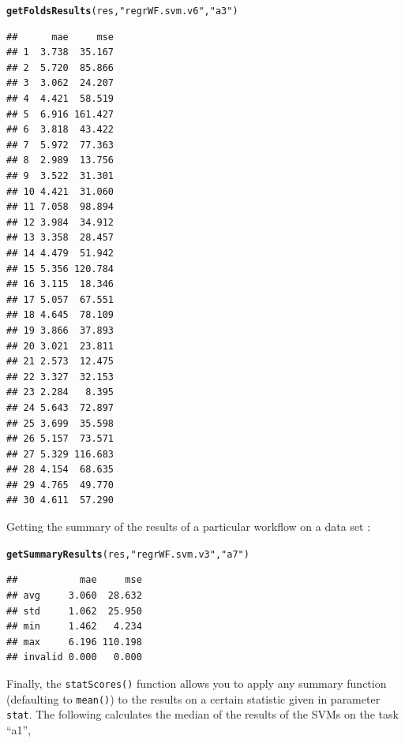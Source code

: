 \documentclass[10pt,a4paper]{article}\usepackage[]{graphicx}\usepackage[]{color}
\makeatletter
\newcommand{\hlstr}[1]{\textcolor[rgb]{0.192,0.494,0.8}{#1}}%
\newcommand{\hlstd}[1]{\textcolor[rgb]{0.345,0.345,0.345}{#1}}%
\newcommand{\hlkwd}[1]{\textcolor[rgb]{0.737,0.353,0.396}{\textbf{#1}}}%
\newenvironment{kframe}{%
 \def\at@end@of@kframe{}%
 \ifinner\ifhmode%
  \def\at@end@of@kframe{\end{minipage}}%
  \begin{minipage}{\columnwidth}%
 \fi\fi%
 \def\FrameCommand##1{\hskip\@totalleftmargin \hskip-\fboxsep
 \colorbox{shadecolor}{##1}\hskip-\fboxsep
     \hskip-\linewidth \hskip-\@totalleftmargin \hskip\columnwidth}%
 \MakeFramed {\advance\hsize-\width
   \@totalleftmargin\z@ \linewidth\hsize
   \@setminipage}}%
 {\par\unskip\endMakeFramed%
 \at@end@of@kframe}
\newenvironment{knitrout}{}{} %
\makeatother
\begin{document}
\begin{knitrout}
\color{fgcolor}\begin{kframe}
\begin{alltt}
\hlkwd{getFoldsResults}\hlstd{(res,} \hlstr{"regrWF.svm.v6"}\hlstd{,} \hlstr{"a3"}\hlstd{)}
\end{alltt}
\begin{verbatim}
##      mae     mse
## 1  3.738  35.167
## 2  5.720  85.866
## 3  3.062  24.207
## 4  4.421  58.519
## 5  6.916 161.427
## 6  3.818  43.422
## 7  5.972  77.363
## 8  2.989  13.756
## 9  3.522  31.301
## 10 4.421  31.060
## 11 7.058  98.894
## 12 3.984  34.912
## 13 3.358  28.457
## 14 4.479  51.942
## 15 5.356 120.784
## 16 3.115  18.346
## 17 5.057  67.551
## 18 4.645  78.109
## 19 3.866  37.893
## 20 3.021  23.811
## 21 2.573  12.475
## 22 3.327  32.153
## 23 2.284   8.395
## 24 5.643  72.897
## 25 3.699  35.598
## 26 5.157  73.571
## 27 5.329 116.683
## 28 4.154  68.635
## 29 4.765  49.770
## 30 4.611  57.290
\end{verbatim}
\end{kframe}
\end{knitrout}


Getting the summary of the results of a particular workflow on a  data set :

\begin{knitrout}
\color{fgcolor}\begin{kframe}
\begin{alltt}
\hlkwd{getSummaryResults}\hlstd{(res,} \hlstr{"regrWF.svm.v3"}\hlstd{,} \hlstr{"a7"}\hlstd{)}
\end{alltt}
\begin{verbatim}
##           mae     mse
## avg     3.060  28.632
## std     1.062  25.950
## min     1.462   4.234
## max     6.196 110.198
## invalid 0.000   0.000
\end{verbatim}
\end{kframe}
\end{knitrout}


Finally, the \texttt{statScores()} function allows you to apply any
summary function (defaulting to \texttt{mean()}) to the results on a
certain statistic given in parameter \texttt{stat}. The following
calculates the median of the results of the SVMs on the task ``a1'',
\end{document}
